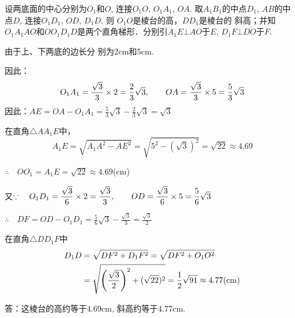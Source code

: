 \begin{figure}[htp]
    \centering
{}
    \caption{}
\end{figure}


\begin{solution}
设两底面的中心分别为$O_1$和$O$, 连接$O_1O$, $O_1A_1$,
 $OA$. 取$A_1B_1$的中点$D_1$, $AB$的中
点$D$, 连接$O_1D_1$, $OD$, $D_1D$. 则
$O_1O$是棱台的高，$DD_1$是棱台的
斜高；并知$O_1A_1AO$和$OO_1D_1D$是两个直角梯形．分别引$A_1E\bot
AO$于$E$, $D_1F\bot DO$于$F$. 

由于上、下两底的边长分
别为2cm和5cm.

因此：
\[O_1A_1=\frac{\sqrt{3}}{3}\x 2=\frac{2}{3}\sqrt{3}, \qquad  OA=\frac{\sqrt{3}}{3}\x 5=\frac{5}{3}\sqrt{3}\]
因此：$AE=OA-O_1A_1=\frac{5}{3}\sqrt{3}-\frac{2}{3}\sqrt{3}=\sqrt{3}$


在直角$\triangle AA_1E$中，
\[A_1E=\sqrt{A_1A^2-AE^2}=\sqrt{5^2-(\sqrt{3})^2}=\sqrt{22}\approx 4.69\]

$\therefore\quad OO_1=A_1E=\sqrt{22}\approx 4.69$(cm)

又$\because\quad O_1D_1=\frac{\sqrt{3}}{6}\x 2=\frac{\sqrt{3}}{3},\qquad OD=\frac{\sqrt{3}}{6}\x 5=\frac{5}{6}{\sqrt{3}}$

$\therefore\quad DF=OD-O_1D_1=\frac{5}{6}{\sqrt{3}}-\frac{\sqrt{3}}{3}=\frac{\sqrt{3}}{2}$

在直角$\triangle DD_1F$中
\[\begin{split}
    D_1D&=\sqrt{DF^2+D_1F^2}=\sqrt{DF^2+O_1O^2}\\
&=\sqrt{\left(\frac{\sqrt{3}}{2}\right)^2+(\sqrt{22})^2}=\frac{1}{2}\sqrt{91}\approx 4.77({\rm cm})
\end{split}\]

答：这棱台的高约等于4.69cm, 斜高约等于4.77cm.
\end{solution}

